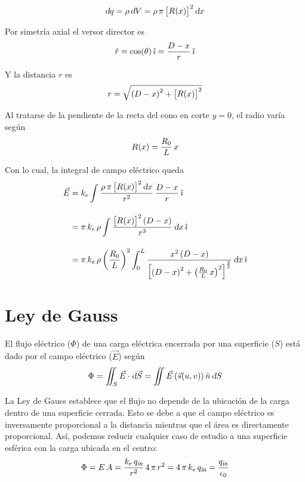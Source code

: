\documentclass[a5paper,12pt,twoside]{book}
\begin{document}
\begin{mdframed}[style=MyFrame2]

    \begin{equation*}
        \dif q = \rho \, \dif V = \rho \, \pi \, \sqb{\fx[R]{x}}^2 \, \dif x
    \end{equation*}

    Por simetría axial el versor director es
    \begin{equation*}
        \versor{r} = \cos(\theta) \, \iVer
        = \frac{D-x}{r} \, \iVer
    \end{equation*}

    Y la distancia $r$ es
    \begin{equation*}
        r = \sqrt{\bb{D-x}^2 + \sqb{\fx[R]{x}}^2}
    \end{equation*}

    Al tratarse de la pendiente de la recta del cono en corte $y=0$, el radio varía según
    \begin{equation*}
        \fx[R]{x} = \frac{R_0}{L} \, x
    \end{equation*}

    Con lo cual, la integral de campo eléctrico queda
    \begin{align*}
        \vec{E} &= \cstcoulomb \int \frac{\rho \, \pi \, \sqb{\fx[R]{x}}^2 \, \dif x}{r^2} \, \frac{D-x}{r} \, \iVer
        \\[1em]
        &= \pi \, \cstcoulomb \, \rho \int \frac{\sqb{\fx[R]{x}}^2 \bb{D-x}}{r^3} \, \dif x \, \iVer
        \\[1em]
        &= \pi \, \cstcoulomb \, \rho \bb{\frac{R_0}{L}}^2 \int_0^L \frac{x^2 \bb{D-x}}{\sqb{\bb{D-x}^2 + \bb{\frac{R_0}{L} \, x}^2}^{\frac{3}{2}}} \, \dif x \, \iVer
    \end{align*}
\end{mdframed}


\section{Ley de Gauss}

El flujo eléctrico ($\Phi$) de una carga eléctrica encerrada por una superficie ($S$) está dado por el campo eléctrico ($\Vec{E}$) según
\begin{equation*}
    \Phi = \iint_S \Vec{E} \cdot \dif \Vec{S} = \iint \Vec{E} \bb{\Vec{s}(u,v)} \versor{n} \, \dif S
\end{equation*}

La Ley de Gauss establece que el flujo no depende de la ubicación de la carga dentro de una superficie cerrada. Esto se debe a que el campo eléctrico es inversamente proporcional a la distancia mientras que el área es directamente proporcional.
Así, podemos reducir cualquier caso de estudio a una superficie esférica con la carga ubicada en el centro:
\begin{equation*}
    \Phi = E \, A = \frac{\cstcoulomb \, \sub{q}{in}}{r^2} \, 4 \, \pi \, r^2 = 4 \, \pi \, \cstcoulomb \, \sub{q}{in} = \frac{\sub{q}{in}}{\epsilon_0}
\end{equation*}
\end{document}
